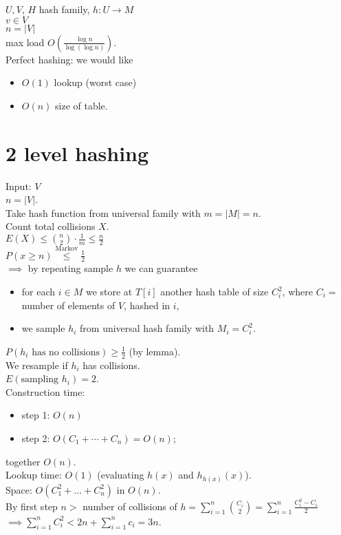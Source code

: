 \documentclass[a4paper, 12pt]{book}
\theoremstyle{definition}
\theoremstyle{remark}
\begin{document}

$U, V$, $H$ hash family, $h: U \to M$ \\
$v \in V$ \\
$n = |V|$ \\
max load $O\left(\frac{\log n}{\log (\log n)}\right)$. \\
Perfect hashing: we would like
\begin{itemize}
  \item $O(1)$ lookup (worst case)
  \item $O(n)$ size of table.
\end{itemize}


\section{2 level hashing}

Input: $V$ \\
$n = |V|$. \\
Take hash function from universal family with $m = |M| = n$. \\
Count total collisions $X$. \\
$E(X) \leq \binom{n}{2} \cdot \frac{1}{m} \leq \frac{n}{2}$ \\
$P(x \geq n) \stackrel{\text{Markov}}{\leq} \frac{1}{2}$ \\
$\implies$ by repeating sample $h$ we can guarantee
\begin{itemize}
  \item for each $i \in M$ we store at $T[i]$ another hash table of size $C_i^2$,
    where $C_i = $ number of elements of $V$, hashed in $i$,
  \item we sample $h_i$ from universal hash family with $M_i = C_i^2$.
\end{itemize}
$P(h_i \text{ has no collisions}) \geq \frac{1}{2}$ (by lemma). \\
We resample if $h_i$ has collisions. \\
$E(\text{sampling } h_i) = 2$. \\
Construction time: \\
\begin{itemize}
  \item step 1: $O(n)$
  \item step 2: $O(C_1 + \cdots + C_n) = O(n)$;
\end{itemize}
together $O(n)$. \\
Lookup time: $O(1)$ (evaluating $h(x)$ and $h_{h(x)}(x)$). \\
Space: $O(C_1^2 + \dots + C_n^2)$ in $O(n)$. \\
By first step $n >$ number of collisions of $h = \sum_{i=1}^{n} \binom{C_i}{2} = \sum_{i=1}^{n} \frac{C_i^2 - C_i}{2}$ \\
$\implies \sum_{i=1}^{n} C_i^2 < 2n + \sum_{i=1}^{n} c_i = 3n$.
\end{document}
